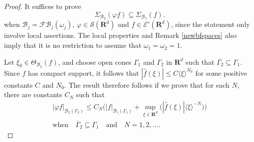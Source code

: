 \documentclass[12pt,a4paper,reqno]{amsart}
\numberwithin{equation}{section}
\numberwithin{thm}{section}
\theoremstyle{definition}
\theoremstyle{remark}
\begin{document}
\par

\begin{proof}
It suffices to prove
\begin{equation}\label{chi-subsetAA}
\Sigma_{ {\mathcal B _2} } ({\varphi} f) \subseteq
\Sigma_{\mathcal B_1} (f).
\end{equation}
when $\mathcal B_j = {\mathscr F\! \mathscr B} _j(\omega _j)$, $ {\varphi} \in  \mathscr S({\mathbf R^{d}})$ and $f\in
\mathscr E'({\mathbf R^{d}})$, since the statement only involve local assertions. The local properties and Remark \ref{newbfspaces} also imply that it is no restriction to assume that $\omega _1 =\omega _2 = 1$.

\par

Let $ \xi_0 \in \Theta_{\mathcal B_2} (f)$,
and choose open cones $\Gamma _1$ and $\Gamma_2$ in ${\mathbf R^{d}}$ such that
$\overline {\Gamma _2}\subseteq \Gamma _1$. Since $f$ has compact
support, it follows that $|\widehat f(\xi )|\le
C{\langle \xi\rangle} ^{N_0}$ for some positive constants $C$ and $N_0$. The result
therefore follows if we prove that for each $N$, there are constants
$C_N$ such that
\begin{multline}\label{cuttoff1}
|{\varphi} f|_{ {\mathcal B _2} (\Gamma _2)}\le C_N \Big (|
f|_{\mathcal B_1(\Gamma _1)} +\sup _{\xi \in {\mathbf R^{d}}} \big ( |\widehat f(\xi )|{\langle \xi\rangle} ^{-N} \big )
\Big )
\\[1ex]
\text{when}\quad \overline \Gamma _2\subseteq \Gamma
_1\quad \text{and}\quad N=1,2,\dots .
\end{multline}

\par


\end{proof}
\end{document}
